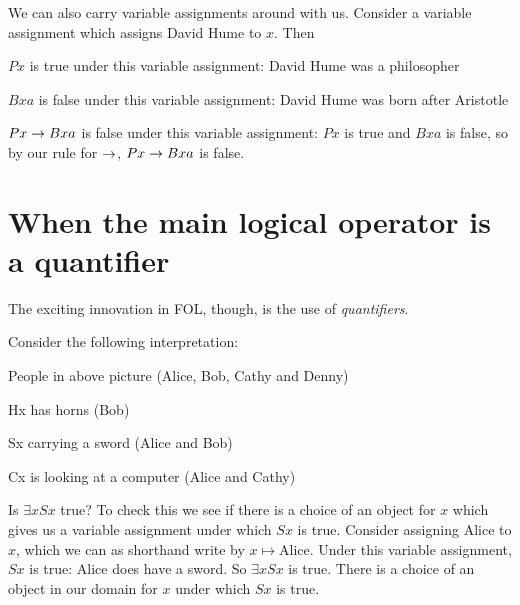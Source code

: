 We can also carry variable assignments around with us. Consider a variable assignment which assigns David Hume to $x$. Then \begin{ebullet}
\item $Px$ is true under this variable assignment: David Hume was a philosopher
\item $Bxa$ is false under this variable assignment: David Hume was born after Aristotle
\item $Px\rightarrow Bxa$ is false under this variable assignment: $Px$ is true and $Bxa$ is false, so by our rule for $\rightarrow$, $Px\rightarrow Bxa$ is false. 
\end{ebullet}


\section{When the main logical operator is a quantifier}
The exciting innovation in FOL, though, is the use of \emph{quantifiers}.

Consider the following interpretation:
\begin{center}

\begin{ekey}\item[\text{domain}] People in above picture (Alice, Bob, Cathy and Denny)
\item[Hx]  has horns (Bob)
\item[Sx]  carrying a sword (Alice and Bob)
\item[Cx] is looking at a computer (Alice and Cathy)
\end{ekey}
\end{center}

Is $\exists x Sx$ true? To check this we see if there is a choice of an object for $x$ which gives us a variable assignment under which $Sx$ is true. Consider assigning Alice to $x$, which we can as shorthand write by $x\mapsto \text{Alice}$. Under this variable assignment, $Sx$ is true: Alice does have a sword. So $\exists x Sx$ is true. There is a choice of an object in our domain for $x$ under which $Sx$ is true.

